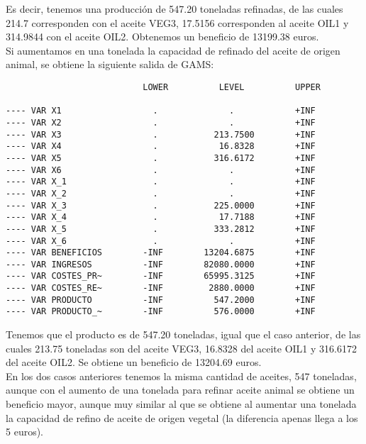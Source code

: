 \documentclass[12pt,a4paper,twoside,openright,titlepage,final]{article}
\begin{document}
Es decir, tenemos una producción de 547.20 toneladas refinadas, de las cuales 214.7 corresponden con el aceite VEG3, 17.5156 corresponden al aceite OIL1 y 314.9844 con el aceite OIL2. Obtenemos un beneficio de 13199.38 euros.\\

Si aumentamos en una tonelada la capacidad de refinado del aceite de origen animal, se obtiene la siguiente salida de GAMS:

\begin{verbatim}
                           LOWER          LEVEL          UPPER        

---- VAR X1                  .              .            +INF          
---- VAR X2                  .              .            +INF         
---- VAR X3                  .           213.7500        +INF              
---- VAR X4                  .            16.8328        +INF               
---- VAR X5                  .           316.6172        +INF                 
---- VAR X6                  .              .            +INF         
---- VAR X_1                 .              .            +INF               
---- VAR X_2                 .              .            +INF               
---- VAR X_3                 .           225.0000        +INF                 
---- VAR X_4                 .            17.7188        +INF                   
---- VAR X_5                 .           333.2812        +INF                   
---- VAR X_6                 .              .            +INF              
---- VAR BENEFICIOS        -INF        13204.6875        +INF            
---- VAR INGRESOS          -INF        82080.0000        +INF           
---- VAR COSTES_PR~        -INF        65995.3125        +INF           
---- VAR COSTES_RE~        -INF         2880.0000        +INF               
---- VAR PRODUCTO          -INF          547.2000        +INF                  
---- VAR PRODUCTO_~        -INF          576.0000        +INF                
\end{verbatim}

Tenemos que el producto es de 547.20 toneladas, igual que el caso anterior, de las cuales 213.75 toneladas son del aceite VEG3, 16.8328 del aceite OIL1 y 316.6172 del aceite OIL2. Se obtiene un beneficio de 13204.69 euros.\\

En los dos casos anteriores tenemos la misma cantidad de aceites, 547 toneladas, aunque con el aumento de una tonelada para refinar aceite animal se obtiene un beneficio mayor, aunque muy similar al que se obtiene al aumentar una tonelada la capacidad de refino de aceite de origen vegetal (la diferencia apenas llega a los 5 euros).
\end{document}
